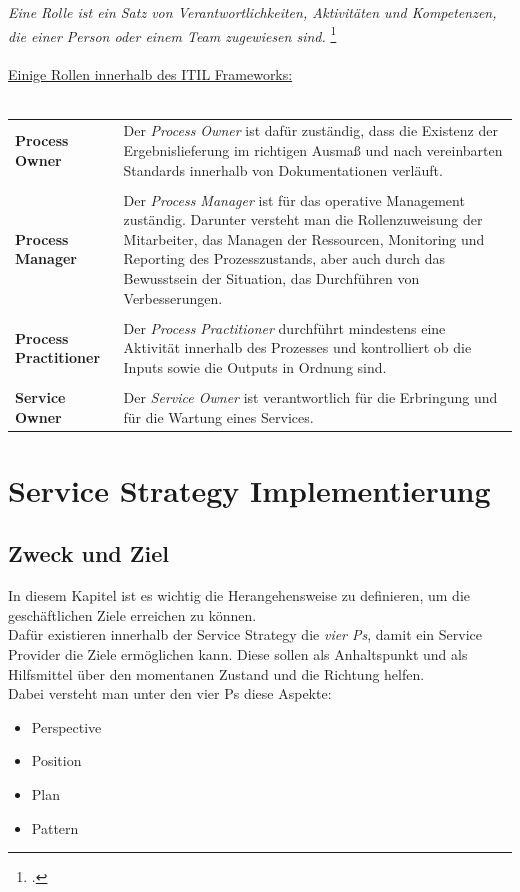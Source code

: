 {\emph{Eine Rolle ist ein Satz von Verantwortlichkeiten, Aktivitäten und Kompetenzen, die einer Person oder einem Team zugewiesen sind.}
\footcite[][Kap.\ 1.5, S.\ 12]{ITIL}
\\ \\
\underline{Einige Rollen innerhalb des ITIL Frameworks:}
\\ \\
\begin{tabular}{l|p{10cm}}
    \textbf{Process Owner} & Der \emph{Process Owner} ist dafür zuständig, dass die Existenz der Ergebnislieferung im richtigen Ausmaß und nach vereinbarten Standards innerhalb von Dokumentationen verläuft. \\ \\
    \textbf{Process Manager} & Der \emph{Process Manager} ist für das operative Management zuständig. Darunter versteht man die Rollenzuweisung der Mitarbeiter, das Managen der Ressourcen, Monitoring und Reporting des Prozesszustands, 
    aber auch durch das Bewusstsein der Situation, das Durchführen von Verbesserungen. \\ \\
    \textbf{Process Practitioner} & Der \emph{Process Practitioner} durchführt mindestens eine Aktivität innerhalb des Prozesses und kontrolliert ob die Inputs sowie die Outputs in Ordnung sind. \\ \\
    \textbf{Service Owner} & Der \emph{Service Owner} ist verantwortlich für die Erbringung und für die Wartung eines Services.
\end{tabular}

\section{Service Strategy Implementierung}
\label{chap: SS Implementierung}

\subsection{Zweck und Ziel}
\label{chap: Zweck und Ziel}

In diesem Kapitel ist es wichtig die Herangehensweise zu definieren, um die geschäftlichen Ziele
erreichen zu können. 
\\
Dafür existieren innerhalb der Service Strategy die \emph{vier Ps}, damit ein Service Provider die Ziele ermöglichen kann.
Diese sollen als Anhaltspunkt und als Hilfsmittel über den momentanen Zustand und die Richtung helfen.
\\
Dabei versteht man unter den vier Ps diese Aspekte:
\\
\begin{itemize}
    \item Perspective
    \item Position
    \item Plan
    \item Pattern
\end{itemize}

}
